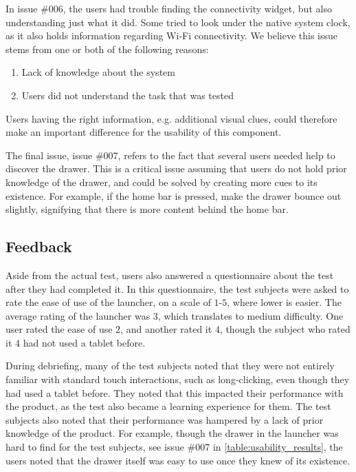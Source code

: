In issue \#{}006, the users had trouble finding the connectivity widget, but also understanding just what it did. 
Some tried to look under the native system clock, as it also holds information regarding Wi-Fi connectivity. 
We believe this issue stems from one or both of the following reasons: 

\begin{enumerate}
	\item Lack of knowledge about the system
	\item Users did not understand the task that was tested
\end{enumerate}

Users having the right information, e.g. additional visual clues, could therefore make an important difference for the usability of this component. \newline

The final issue, issue \#{}007, refers to the fact that several users needed help to discover the drawer. 
This is a critical issue assuming that users do not hold prior knowledge of the drawer, and could be solved by creating more cues to its existence. 
For example, if the home bar is pressed, make the drawer bounce out slightly, signifying that there is more content behind the home bar. 

\subsection{Feedback}
Aside from the actual test, users also answered a questionnaire about the test after they had completed it. 
In this questionnaire, the test subjects were asked to rate the ease of use of the launcher, on a scale of $1$-$5$, where lower is easier. 
The average rating of the launcher was $3$, which translates to medium difficulty. 
One user rated the ease of use $2$, and another rated it $4$, though the subject who rated it $4$ had not used a tablet before. \newline

During debriefing, many of the test subjects noted that they were not entirely familiar with standard touch interactions, such as long-clicking, even though they had used a tablet before. 
They noted that this impacted their performance with the product, as the test also became a learning experience for them. 
The test subjects also noted that their performance was hampered by a lack of prior knowledge of the product. 
For example, though the drawer in the \giraf[] launcher was hard to find for the test subjects, see issue \#{}007 in \autoref{table:usability_results}, the users noted that the drawer itself was easy to use once they knew of its existence. 